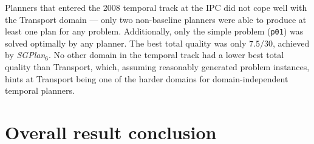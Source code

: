 Planners that entered the 2008 temporal track at the IPC did not cope well with the Transport domain
--- only two non-baseline planners were able to produce at least one plan
for any problem. Additionally, only the simple problem (\verb+p01+) was solved
optimally by any planner. The best total quality was only $7.5/30$, achieved by
\textit{SGPlan$_6$}. No other domain in the temporal track had a lower best total quality
than Transport, which, assuming reasonably generated problem instances, hints
at Transport being one of the harder domains for domain-independent temporal planners.


\section{Overall result conclusion}


